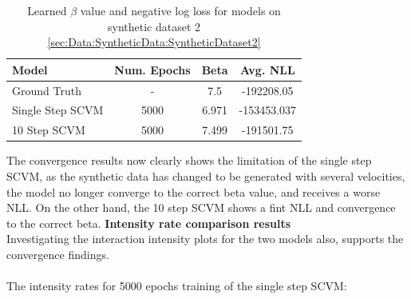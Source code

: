 \begin{table}[H]
\centering
\begin{tabular}{|l|c|cc|}
\hline
Model         & \multicolumn{1}{l|}{Num. Epochs} & Beta & Avg. NLL \\ \hline
Ground Truth  & -                                & 7.5  & -192208.05 \\
Single Step SCVM & 5000                          & 6.971 &  -153453.037      \\
10 Step SCVM & 5000                          & 7.499   & -191501.75      \\ \hline
\end{tabular}
\caption{Learned $\beta$ value and negative log loss for models on synthetic dataset 2 \ref{sec:Data:SyntheticData:SyntheticDataset2}}
\label{tab:MultiStep1}
\end{table}
\noindent 
The convergence results now clearly shows the limitation of the single step SCVM, as the synthetic data has changed to be generated with several velocities, the model no longer converge to the correct beta value, and receives a worse NLL. On the other hand, the 10 step SCVM shows a fint NLL and convergence to the correct beta.
\clearpage
\vspace*{-2cm}
\noindent
\textbf{Intensity rate comparison results}
\\
Investigating the interaction intensity plots for the two models also, supports the convergence findings.
\\\\
The intensity rates for 5000 epochs training of the single step SCVM:
